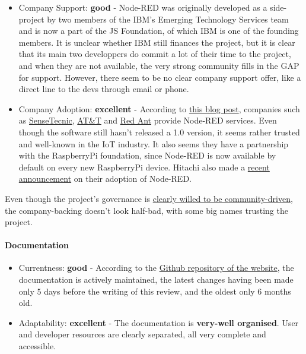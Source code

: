 \documentclass{article}
\begin{document}
\begin{itemize}
\item Company Support: \textbf{good} - Node-RED was originally developed as a side-project by two members of the IBM’s Emerging Technology Services team and is now a part of the JS Foundation, of which IBM is one of the founding members. It is unclear whether IBM still finances the project, but it is clear that its main two developpers do commit a lot of their time to the project, and when they are not available, the very strong community fills in the GAP for support. However, there seem to be no clear company support offer, like a direct line to the devs through email or phone.
\item Company Adoption: \textbf{excellent} - According to \href{https://nodered.org/blog/2016/10/17/js-foundation}{this blog post}, companies such as \href{https://fred.sensetecnic.com/}{SenseTecnic}, \href{https://flow.att.com/}{AT\&T} and \href{https://www.redconnect.io/}{Red Ant} provide Node-RED services. Even though the software still hasn't released a 1.0 version, it seems rather trusted and well-known in the IoT industry. It also seems they have a partnership with the RaspberryPi foundation, since Node-RED is now available by default on every new RaspberryPi device. Hitachi also made a \href{http://www.prweb.com/releases/2017/08/prweb14579081.htm}{recent announcement} on their adoption of Node-RED.
\end{itemize}

Even though the project's governance is \href{https://nodered.org/about/governance/}{clearly willed to be community-driven}, the company-backing doesn't look half-bad, with some big names trusting the project.

\paragraph{Documentation}

\begin{itemize}
\item Currentness: \textbf{good} - According to the \href{https://github.com/node-red/node-red.github.io/tree/master/docs}{Github repository of the website}, the documentation is actively maintained, the latest changes having been made only 5 days before the writing of this review, and the oldest only 6 months old.
\item Adaptability: \textbf{excellent} - The documentation is \textbf{very-well organised}. User and developer resources are clearly separated, all very complete and accessible.
\end{itemize}
\end{document}
